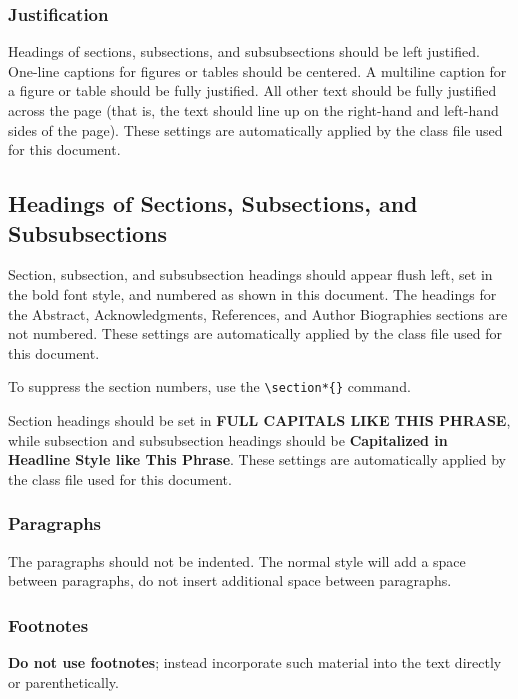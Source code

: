 \documentclass{article}
\begin{document}
\subsubsection{Justification}

Headings of sections, subsections, and subsubsections should be left justified. One-line captions for figures or tables should be centered. A multiline caption for a figure or table should be fully justified. All other text should be fully justified across the page (that is, the text should line up on the right-hand and left-hand sides of the page). These settings are automatically applied by the class file used for this document.

\subsection{Headings of Sections, Subsections, and Subsubsections}

Section, subsection, and subsubsection headings should appear flush left, set in the bold font style, and numbered as shown in this document. The headings for the Abstract, Acknowledgments, References, and Author Biographies sections are not numbered. These settings are automatically applied by the class file used for this document.

To suppress the section numbers, use the \verb+\section*{}+ command.

Section headings should be set in \textbf{\uppercase{full capitals like this phrase}}, while subsection and subsubsection headings should be \textbf{Capitalized
in Headline Style like This Phrase}. These settings are automatically applied by the class file used for this document.

\subsubsection{Paragraphs}
The paragraphs should not be indented. The normal style will add a space between paragraphs, do not insert additional space between paragraphs.

\subsubsection{Footnotes}
\textbf{Do not use footnotes}; instead incorporate such material into the text directly or parenthetically.
\end{document}
